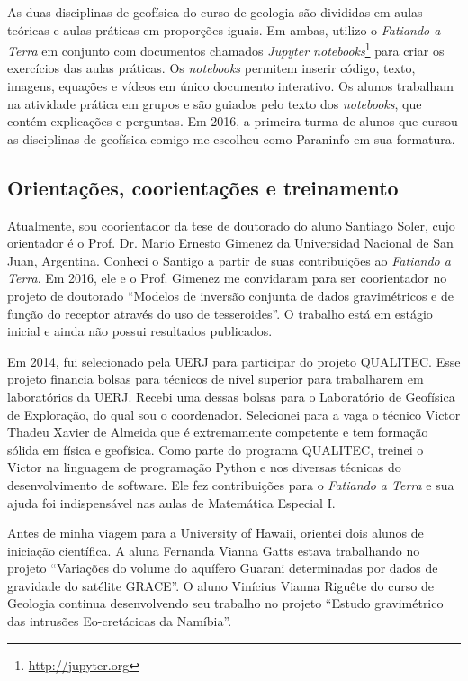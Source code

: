 As duas disciplinas de geofísica do curso de
geologia
são divididas em aulas
teóricas e aulas práticas em proporções iguais.
Em ambas, utilizo o \textit{Fatiando a Terra} em conjunto com documentos
chamados \textit{Jupyter notebooks}\footnote{\url{http://jupyter.org}} para
criar os exercícios das aulas práticas.
Os \textit{notebooks} permitem inserir código, texto, imagens, equações e
vídeos em único documento interativo.
Os alunos trabalham na atividade prática em grupos e são guiados pelo texto dos
\textit{notebooks}, que contém explicações e perguntas.
Em 2016, a primeira turma de alunos que cursou as disciplinas de geofísica
comigo me escolheu como Paraninfo em sua formatura.



\subsection{Orientações, coorientações e treinamento}

Atualmente, sou coorientador da tese de doutorado do aluno Santiago Soler, cujo
orientador é o Prof. Dr. Mario Ernesto Gimenez da Universidad Nacional de San
Juan, Argentina.
Conheci o Santigo a partir de suas contribuições ao \textit{Fatiando a Terra}.
Em 2016, ele e o Prof. Gimenez me convidaram para ser coorientador no projeto
de doutorado ``Modelos de inversão conjunta de dados gravimétricos e de função
do receptor através do uso de tesseroides''.
O trabalho está em estágio inicial e ainda não possui resultados publicados.

Em 2014, fui selecionado pela UERJ para participar do projeto QUALITEC.
Esse projeto financia bolsas para técnicos de nível superior para
trabalharem em laboratórios da UERJ.
Recebi uma dessas bolsas para o Laboratório de Geofísica de Exploração, do qual
sou o coordenador.
Selecionei para a vaga o técnico Victor Thadeu Xavier de Almeida que é
extremamente competente e tem formação sólida em física e geofísica.
Como parte do programa QUALITEC, treinei o Victor na linguagem de programação
Python e nos diversas técnicas do desenvolvimento de software.
Ele fez contribuições para o \textit{Fatiando a Terra} e sua ajuda foi
indispensável nas aulas de Matemática Especial I.

Antes de minha viagem para a University of Hawaii, orientei dois alunos de
iniciação científica.
A aluna Fernanda Vianna Gatts estava trabalhando no projeto
``Variações do volume do aquífero Guarani determinadas por dados de gravidade
do satélite GRACE''.
O aluno Vinícius Vianna Riguête do curso de Geologia continua desenvolvendo seu
trabalho no projeto ``Estudo gravimétrico das intrusões
Eo-cretácicas da Namíbia''.
